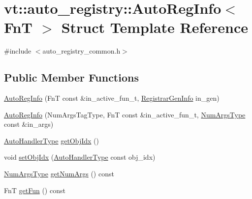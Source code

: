 \hypertarget{structvt_1_1auto__registry_1_1_auto_reg_info}{}\section{vt\+:\+:auto\+\_\+registry\+:\+:Auto\+Reg\+Info$<$ FnT $>$ Struct Template Reference}
\label{structvt_1_1auto__registry_1_1_auto_reg_info}


{\ttfamily \#include $<$auto\+\_\+registry\+\_\+common.\+h$>$}

\subsection*{Public Member Functions}
\begin{DoxyCompactItemize}
\item 
\hyperlink{structvt_1_1auto__registry_1_1_auto_reg_info_a57928f8fb49b3a015d27840b4328be44}{Auto\+Reg\+Info} (FnT const \&in\+\_\+active\+\_\+fun\+\_\+t, \hyperlink{structvt_1_1auto__registry_1_1_registrar_gen_info}{Registrar\+Gen\+Info} in\+\_\+gen)
\item 
\hyperlink{structvt_1_1auto__registry_1_1_auto_reg_info_a30060ab05ce35a6b8c3bd2d5d23e995f}{Auto\+Reg\+Info} (Num\+Args\+Tag\+Type, FnT const \&in\+\_\+active\+\_\+fun\+\_\+t, \hyperlink{namespacevt_1_1auto__registry_aebda1d9d765bc9147dc654ad0712c936}{Num\+Args\+Type} const \&in\+\_\+args)
\item 
\hyperlink{namespacevt_1_1auto__registry_ae295e18699146815bb7d7674594d95d7}{Auto\+Handler\+Type} \hyperlink{structvt_1_1auto__registry_1_1_auto_reg_info_a3dabecf4e0f40b05cc8f6657e9232b71}{get\+Obj\+Idx} ()
\item 
void \hyperlink{structvt_1_1auto__registry_1_1_auto_reg_info_a620c9ece26186f0ac64901d74538c333}{set\+Obj\+Idx} (\hyperlink{namespacevt_1_1auto__registry_ae295e18699146815bb7d7674594d95d7}{Auto\+Handler\+Type} const obj\+\_\+idx)
\item 
\hyperlink{namespacevt_1_1auto__registry_aebda1d9d765bc9147dc654ad0712c936}{Num\+Args\+Type} \hyperlink{structvt_1_1auto__registry_1_1_auto_reg_info_abf206854a022455be3f70a18d261671d}{get\+Num\+Args} () const
\item 
FnT \hyperlink{structvt_1_1auto__registry_1_1_auto_reg_info_ae03a0d6a163e158771fbb28b0ba8dd62}{get\+Fun} () const
\end{DoxyCompactItemize}
